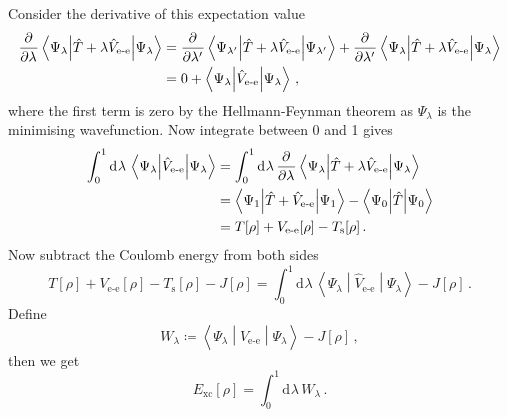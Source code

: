 \documentclass{article}
\theoremstyle{plain}\theoremheaderfont{\normalfont\itshape}\theorembodyfont{\rmfamily}\theoremseparator{.}\newtheorem*{rem}{Remark}\newtheorem*{ex}{Example}\newtheorem*{proof}{Proof}\newtheorem*{altp}{Alternative proof}
\theoremstyle{plain}\theoremheaderfont{\normalfont\bfseries}\theorembodyfont{\rmfamily}\theoremseparator{.}\newtheorem{thm}{Theorem}[section]\newtheorem{lem}[thm]{Lemma}\newtheorem{prop}[thm]{Proposition}\newtheorem*{cor}{Corollary}\newtheorem{defn}[thm]{Definition}\newtheorem{clm}[thm]{Claim}\newtheorem{clminproof}{Claim}
\theoremstyle{break}\theoremheaderfont{\normalfont\itshape}\theorembodyfont{\rmfamily}\theoremseparator{.\medskip}\newtheorem*{proofskip}{Proof}\newtheorem*{exs}{Examples}\newtheorem*{rems}{Remarks}
\theoremstyle{break}\theoremheaderfont{\normalfont\bfseries}\theorembodyfont{\rmfamily}\theoremseparator{.\medskip}\newtheorem{lemskip}[thm]{Lemma}\newtheorem{defnskip}[thm]{Definition}\newtheorem{propskip}[thm]{Proposition}\newtheorem{thmskip}[thm]{Theorem}
\numberwithin{equation}{section}
\newcommand{\dd}[2][]{\mathrm{d}^{#1} #2\,}
\newcommand{\pdv}[3][]{\frac{\partial^{#1} #2}{{\partial #3}^{#1}}}
\newcommand{\expval}[2]{\left\langle #2 \middle| #1 \middle| #2 \right\rangle}
\newcommand{\ee}{_{\text{e-e}}}
\newcommand{\s}{_{\text{s}}}
\newcommand{\xc}{_{\text{xc}}}
\begin{document}
    Consider the derivative of this expectation value
    \begin{align}
        \pdv{}{\lambda}\expval{\hat{T}+\lambda\hat{V}\ee}{\Psi_\lambda}&=\pdv{}{\lambda'}\expval{\hat{T}+\lambda\hat{V}\ee}{\Psi_{\lambda'}}+\pdv{}{\lambda'}\expval{\hat{T}+\lambda\hat{V}\ee}{\Psi_{\lambda}}\notag\\
        &=0+\expval{\hat{V}\ee}{\Psi_{\lambda}}\,,
    \end{align}
    where the first term is zero by the Hellmann-Feynman theorem as \(\Psi_\lambda\) is the minimising wavefunction. Now integrate between 0 and 1 gives
    \begin{align}
        \int_{0}^{1}\dd{\lambda}\expval{\hat{V}\ee}{\Psi_\lambda}&=\int_{0}^{1}\dd{\lambda}\pdv{}{\lambda}\expval{\hat{T}+\lambda\hat{V}\ee}{\Psi_\lambda}\notag\\
        &=\expval{\hat{T}+\hat{V}\ee}{\Psi_1}-\expval{\hat{T}}{\Psi_0}\notag\\
        &=T[\rho]+V\ee[\rho]-T\s[\rho]\,.
    \end{align}
    Now subtract the Coulomb energy from both sides
    \begin{equation}
        T[\rho]+V\ee[\rho]-T\s[\rho]-J[\rho]=\int_{0}^{1}\dd{\lambda}\expval{\hat{V}\ee}{\Psi_\lambda}-J[\rho]\,.
    \end{equation}
    Define
    \begin{equation}
        W_\lambda\coloneqq\expval{\hat{V}\ee}{\Psi_\lambda}-J[\rho]\,,
    \end{equation}
    then we get
    \begin{equation}
        E\xc[\rho]=\int_{0}^{1}\dd{\lambda}W_\lambda\,.
    \end{equation}
\end{document}
